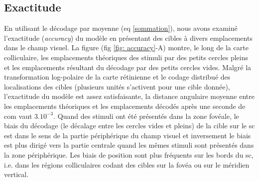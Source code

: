 \subsection{Exactitude}

En utilisant le décodage par moyenne (eq \ref{sommation}), nous avons examiné l'exactitude (\textit{accuracy}) du modèle en présentant des cibles à divers emplacements dans le champ visuel. La figure (fig \ref{fig: accuracy}-A) montre, le long de la carte colliculaire, les emplacements théoriques des stimuli par des petits cercles pleins et les emplacements résultant du décodage par des petits cercles vides. Malgré la transformation log-polaire de la carte rétinienne et le codage distribué des localisations des cibles (plusieurs unités s'activent pour une cible donnée), l'exactitude du modèle est assez satisfaisante, la distance angulaire moyenne entre les emplacements théoriques et les emplacements décodés après une seconde de com vaut $3.10^{-3}$. Quand des stimuli ont été présentés dans la zone fovéale, le biais du décodage (le décalage entre les cercles vides et pleins) de la cible sur le \gls{sc} est dans le sens de la partie périphérique du champ visuel et inversement le biais est plus dirigé vers la partie centrale quand les mêmes stimuli sont présentés dans la zone périphérique. Les biais de position sont plus fréquents sur les bords du \gls{sc}, i.e. dans les régions colliculaires codant des cibles sur la fovéa ou sur le méridien vertical.


